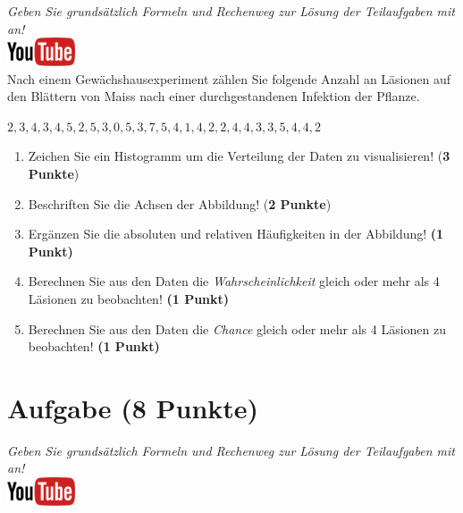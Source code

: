 \documentclass[a4paper, 9pt]{scrartcl}\usepackage[]{graphicx}\usepackage[]{xcolor}
\begin{document}
\textit{Geben Sie grunds{\"a}tzlich Formeln und Rechenweg zur L{\"o}sung der
  Teilaufgaben mit an!} \\[1Ex]

\hfill\href{https://youtu.be/aXvxGC4YLqk}{\includegraphics[width =
  2cm]{img/youtube}}\\[1Ex]



Nach einem Gew{\"a}chshausexperiment z{\"a}hlen Sie folgende Anzahl an L{\"a}sionen auf den
Bl{\"a}ttern von Maiss nach einer durchgestandenen Infektion der Pflanze. 

\begin{center}
$2, 3, 4, 3, 4, 5, 2, 5, 3, 0, 5, 3, 7, 5, 4, 1, 4, 2, 2, 4, 4, 3, 3, 5, 4, 4, 2$
\end{center}

\begin{enumerate}
\item Zeichen Sie ein Histogramm um die Verteilung der Daten zu visualisieren! (\textbf{3 Punkte})
\item Beschriften Sie die Achsen der Abbildung! (\textbf{2 Punkte})
\item Erg{\"a}nzen Sie die absoluten und relativen H{\"a}ufigkeiten in der
  Abbildung! \textbf{(1 Punkt)}
\item Berechnen Sie aus den Daten die \textit{Wahrscheinlichkeit}
  gleich oder mehr als 4 L{\"a}sionen zu beobachten! \textbf{(1
    Punkt)}
\item Berechnen Sie aus den Daten die \textit{Chance} gleich oder mehr
  als 4 L{\"a}sionen zu beobachten! \textbf{(1 Punkt)}
\end{enumerate}

 
\clearpage

\section{Aufgabe \hfill (8 Punkte)}

\textit{Geben Sie grunds{\"a}tzlich Formeln und Rechenweg zur L{\"o}sung der
  Teilaufgaben mit an!} \\[1Ex]

\hfill\href{https://youtu.be/ORHSPTCdfeY}{\includegraphics[width =
  2cm]{img/youtube}}\\[1Ex]
\end{document}
